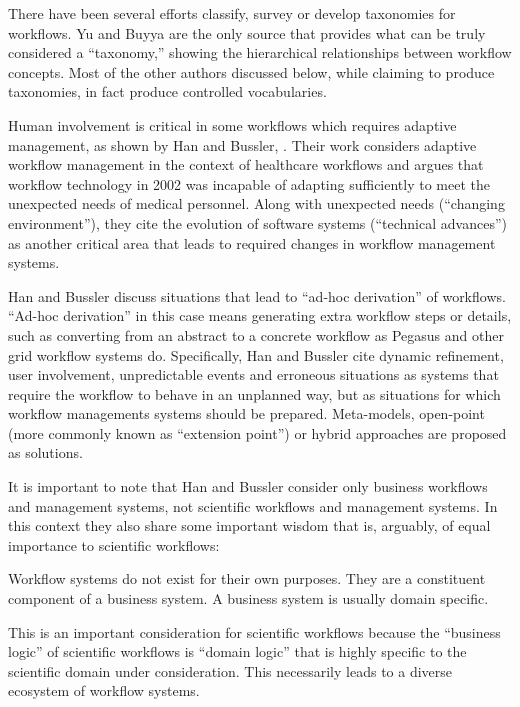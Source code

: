 There have been several efforts classify, survey or develop taxonomies
for workflows. Yu and Buyya are the only source that provides what can
be truly considered a ``taxonomy,'' showing the hierarchical
relationships between workflow concepts. Most of the other authors
discussed below, while claiming to produce taxonomies, in fact produce
controlled vocabularies.

Human involvement is critical in some workflows which requires adaptive
management, as shown by Han and Bussler, \cite{han_taxonomy_1998}. Their work
considers adaptive workflow management in the context of healthcare
workflows and argues that workflow technology in 2002 was incapable of
adapting sufficiently to meet the unexpected needs of medical personnel.
Along with unexpected needs (``changing environment''), they cite the
evolution of software systems (``technical advances'') as another
critical area that leads to required changes in workflow management
systems.

Han and Bussler discuss situations that lead to ``ad-hoc derivation'' of
workflows. ``Ad-hoc derivation'' in this case means generating extra
workflow steps or details, such as converting from an abstract to a
concrete workflow as Pegasus and other grid workflow systems do.
Specifically, Han and Bussler cite dynamic refinement, user involvement,
unpredictable events and erroneous situations as systems that require
the workflow to behave in an unplanned way, but as situations for which
workflow managements systems should be prepared. Meta-models, open-point
(more commonly known as ``extension point'') or hybrid approaches are
proposed as solutions.

It is important to note that Han and Bussler consider only business
workflows and management systems, not scientific workflows and
management systems. In this context they also share some important
wisdom that is, arguably, of equal importance to scientific workflows:

\begin{displayquote}
Workflow systems do not exist for their own purposes. They
are a constituent component of a business system. A business system is usually domain
specific.
\end{displayquote}

This is an important consideration for scientific workflows because the
``business logic'' of scientific workflows is ``domain logic'' that is
highly specific to the scientific domain under consideration. This
necessarily leads to a diverse ecosystem of workflow systems.

